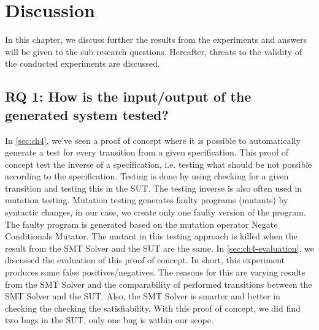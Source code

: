 \chapter{Discussion}

In this chapter, we discuss further the results from the experiments and answers will be given to the sub research questions. Hereafter, threats to the validity of the conducted experiments are discussed.

\section{RQ 1: How is the input/output of the generated system tested?}

In \autoref{sec:ch4}, we've seen a proof of concept where it is possible to automatically generate a test for every transition from a given specification. This proof of concept test the inverse of a specification, i.e. testing what should be not possible according to the specification. Testing is done by using checking for a given transition and testing this in the SUT. The testing inverse is also often used in mutation testing. Mutation testing generates faulty programs (mutants) by syntactic changes, in our case, we create only one faulty version of the program. The faulty program is generated based on the mutation operator Negate Conditionals Mutator. The mutant in this testing approach is killed when the result from the SMT Solver and the SUT are the same. In \autoref{sec:ch4-evaluation}, we discussed the evaluation of this proof of concept. In short, this experiment produces some false positives/negatives. The reasons for this are varying results from the SMT Solver and the comparability of performed transitions between the SMT Solver and the SUT. Also, the SMT Solver is smarter and better in checking the checking the satisfiability. With this proof of concept, we did find two bugs in the SUT, only one bug is within our scope.

